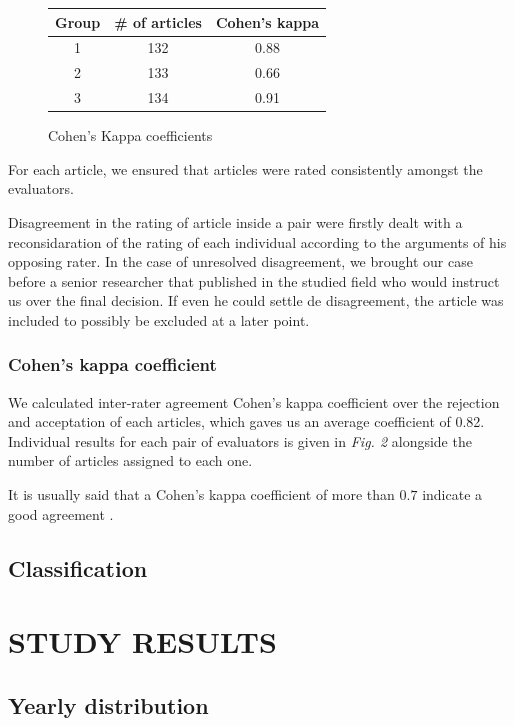 \documentclass[letterpaper, 10 pt, conference]{ieeeconf}  %
\begin{document}
\begin{figure}
 \centering
  \begin{tabular}{ ccc }
   \bf Group & \bf \# of articles & \bf Cohen's kappa \\
   \hline {}
   1 & 132 & 0.88 \\
   2 & 133 & 0.66 \\
   3 & 134 & 0.91 \\
 \end{tabular}
 \caption{Cohen's Kappa coefficients}
\end{figure}

For each article, we ensured that articles were rated consistently amongst the
evaluators.

Disagreement in the rating of article inside a pair were firstly dealt with a
reconsidaration of the rating of each individual according to the arguments of his opposing rater.
In the case of unresolved disagreement, we brought our case before a senior
researcher that published in the studied field who would instruct us over the final
decision.
If even he could settle de disagreement, the article was included to possibly be
excluded at a later point.


\subsubsection{Cohen's kappa coefficient}
We calculated inter-rater agreement Cohen's kappa coefficient over the
rejection and acceptation of each articles, which gaves us an average coefficient
of 0.82.
Individual results for each pair of evaluators is given in \textit{Fig. 2}
alongside the number of articles assigned to each one.

It is usually said that a Cohen's kappa coefficient of more than $0.7$ indicate
a good agreement \cite{c3}.


\subsection{Classification}


\section{STUDY RESULTS}

\subsection{Yearly distribution}
\end{document}
